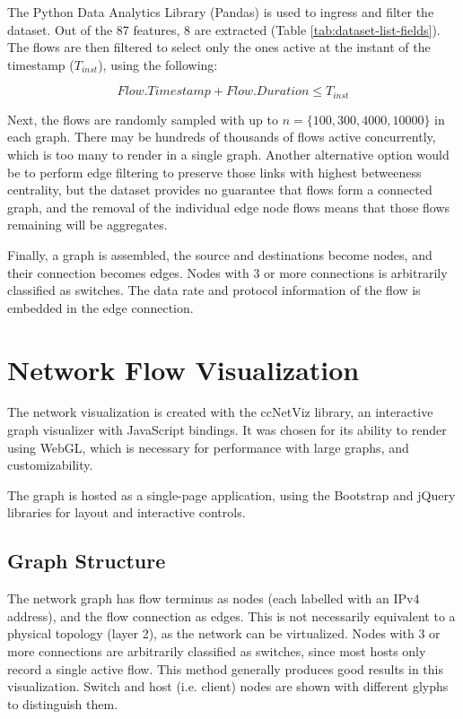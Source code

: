 \documentclass{vgtc}                          %
\begin{document}
The Python Data Analytics Library (Pandas) \cite{reback2020pandas} is used to ingress and filter the dataset. Out of the 87 features, 8 are extracted (Table \ref{tab:dataset-list-fields}). The flows are then filtered to select only the ones active at the instant of the timestamp (\(T_{inst}\)), using the following:

\begin{equation}
    Flow.Timestamp + Flow.Duration \leq T_{inst}
\end{equation}

Next, the flows are randomly sampled with up to \(n = \{100,300,4000,10000\}\) in each graph. There may be hundreds of thousands of flows active concurrently, which is too many to render in a single graph. Another alternative option would be to perform edge filtering to preserve those links with highest betweeness centrality, but the dataset provides no guarantee that flows form a connected graph, and the removal of the individual edge node flows means that those flows remaining will be aggregates.

Finally, a graph is assembled, the source and destinations become nodes, and their connection becomes edges. Nodes with 3 or more connections is arbitrarily classified as switches. The data rate and protocol information of the flow is embedded in the edge connection.

\section{Network Flow Visualization}

The network visualization is created with the ccNetViz \cite{ccnetviz} library, an interactive graph visualizer with JavaScript bindings. It was chosen for its ability to render using WebGL, which is necessary for performance with large graphs, and customizability.

The graph is hosted as a single-page application, using the Bootstrap \cite{bootstrap} and jQuery \cite{jquery} libraries for layout and interactive controls.

\subsection{Graph Structure}

The network graph has flow terminus as nodes (each labelled with an IPv4 address), and the flow connection as edges. This is not necessarily equivalent to a physical topology (layer 2), as the network can be virtualized. Nodes with 3 or more connections are arbitrarily classified as switches, since most hosts only record a single active flow. This method generally produces good results in this visualization. Switch and host (i.e. client) nodes are shown with different glyphs to distinguish them.
\end{document}

